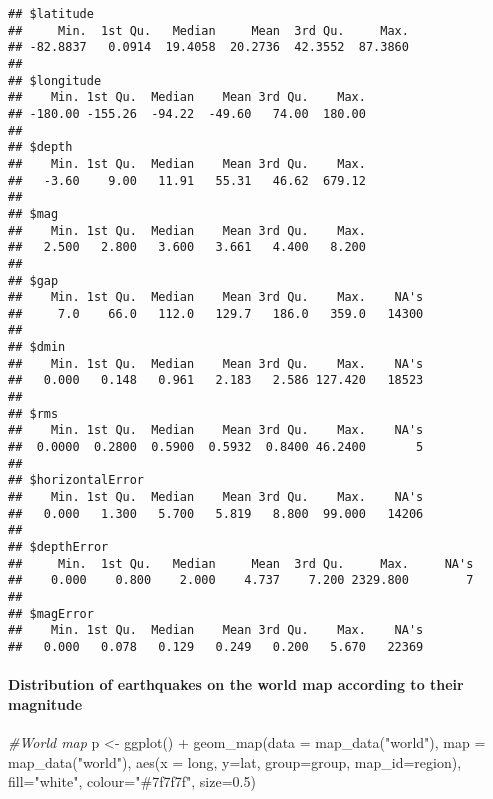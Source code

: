 \documentclass[
]{article}
\newenvironment{Shaded}{\begin{snugshade}}{\end{snugshade}}
\newcommand{\AttributeTok}[1]{\textcolor[rgb]{0.77,0.63,0.00}{#1}}
\newcommand{\CommentTok}[1]{\textcolor[rgb]{0.56,0.35,0.01}{\textit{#1}}}
\newcommand{\FloatTok}[1]{\textcolor[rgb]{0.00,0.00,0.81}{#1}}
\newcommand{\FunctionTok}[1]{\textcolor[rgb]{0.00,0.00,0.00}{#1}}
\newcommand{\NormalTok}[1]{#1}
\newcommand{\OtherTok}[1]{\textcolor[rgb]{0.56,0.35,0.01}{#1}}
\newcommand{\SpecialCharTok}[1]{\textcolor[rgb]{0.00,0.00,0.00}{#1}}
\newcommand{\StringTok}[1]{\textcolor[rgb]{0.31,0.60,0.02}{#1}}
\begin{document}
\begin{verbatim}
## $latitude
##     Min.  1st Qu.   Median     Mean  3rd Qu.     Max. 
## -82.8837   0.0914  19.4058  20.2736  42.3552  87.3860 
## 
## $longitude
##    Min. 1st Qu.  Median    Mean 3rd Qu.    Max. 
## -180.00 -155.26  -94.22  -49.60   74.00  180.00 
## 
## $depth
##    Min. 1st Qu.  Median    Mean 3rd Qu.    Max. 
##   -3.60    9.00   11.91   55.31   46.62  679.12 
## 
## $mag
##    Min. 1st Qu.  Median    Mean 3rd Qu.    Max. 
##   2.500   2.800   3.600   3.661   4.400   8.200 
## 
## $gap
##    Min. 1st Qu.  Median    Mean 3rd Qu.    Max.    NA's 
##     7.0    66.0   112.0   129.7   186.0   359.0   14300 
## 
## $dmin
##    Min. 1st Qu.  Median    Mean 3rd Qu.    Max.    NA's 
##   0.000   0.148   0.961   2.183   2.586 127.420   18523 
## 
## $rms
##    Min. 1st Qu.  Median    Mean 3rd Qu.    Max.    NA's 
##  0.0000  0.2800  0.5900  0.5932  0.8400 46.2400       5 
## 
## $horizontalError
##    Min. 1st Qu.  Median    Mean 3rd Qu.    Max.    NA's 
##   0.000   1.300   5.700   5.819   8.800  99.000   14206 
## 
## $depthError
##     Min.  1st Qu.   Median     Mean  3rd Qu.     Max.     NA's 
##    0.000    0.800    2.000    4.737    7.200 2329.800        7 
## 
## $magError
##    Min. 1st Qu.  Median    Mean 3rd Qu.    Max.    NA's 
##   0.000   0.078   0.129   0.249   0.200   5.670   22369
\end{verbatim}

\hypertarget{distribution-of-earthquakes-on-the-world-map-according-to-their-magnitude}{%
\paragraph{Distribution of earthquakes on the world map according to
their
magnitude}\label{distribution-of-earthquakes-on-the-world-map-according-to-their-magnitude}}

\begin{Shaded}
\begin{Highlighting}[]
\CommentTok{\#World map}
\NormalTok{p }\OtherTok{\textless{}{-}} \FunctionTok{ggplot}\NormalTok{() }\SpecialCharTok{+} \FunctionTok{geom\_map}\NormalTok{(}\AttributeTok{data =} \FunctionTok{map\_data}\NormalTok{(}\StringTok{"world"}\NormalTok{), }\AttributeTok{map =} \FunctionTok{map\_data}\NormalTok{(}\StringTok{"world"}\NormalTok{), }\FunctionTok{aes}\NormalTok{(}\AttributeTok{x =}\NormalTok{ long, }\AttributeTok{y=}\NormalTok{lat, }\AttributeTok{group=}\NormalTok{group, }\AttributeTok{map\_id=}\NormalTok{region), }\AttributeTok{fill=}\StringTok{"white"}\NormalTok{, }\AttributeTok{colour=}\StringTok{"\#7f7f7f"}\NormalTok{, }\AttributeTok{size=}\FloatTok{0.5}\NormalTok{)}
\end{Highlighting}
\end{Shaded}
\end{document}
